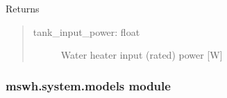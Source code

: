 \documentclass[letterpaper,10pt,english,openany]{sphinxmanual}
\begin{document}
\begin{fulllineitems}
\begin{fulllineitems}
\begin{quote}
\begin{description}
\end{description}
\end{quote}

Returns
\begin{quote}
\begin{description}
\item[{tank\_input\_power: float}] \leavevmode
Water heater input (rated) power {[}W{]}

\end{description}
\end{quote}

\end{fulllineitems}


\end{fulllineitems}



\subsubsection{mswh.system.models module}
\label{\detokenize{source/mswh.system:module-mswh.system.models}}\label{\detokenize{source/mswh.system:mswh-system-models-module}}
\end{document}
